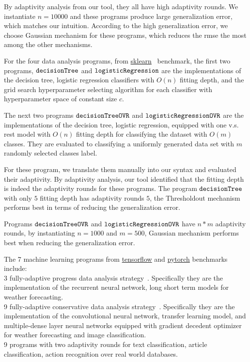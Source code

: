 By adaptivity analysis from our tool, they all have high adaptivity rounds.
We instantiate $n = 10000$ and these programs produce large generalization error, which matches our intuition.
According to the high generalization error, we choose Gaussian mechanism for these programs, which reduces the rmse the most
among the other mechanisms.


For the four data analysis programs, 
from \hyperlink{https://github.com/scikit-learn/scikit-learn/tree/main/examples}{sklearn}~\cite{SklearnBenchmark} benchmark,
the first two programs, $\mathtt{decisionTree}$ and $\mathtt{logisticRegression}$ are
the
implementations of the decision tree, logistic regression classifiers
with $O(n)$ fitting depth,
and the grid search hyperparameter selecting algorithm for each classifier with 
hyperparameter space of constant size $c$.

The next two programs $\mathtt{decisionTreeOVR}$ and $\mathtt{logisticRegressionOVR}$ are
the implementations of the  decision tree, logistic regression, equipped with one v.s. rest model with $O(n)$ fitting depth for classifying the dataset with $O(m)$ classes.
They are evaluated to classifying a uniformly generated data set with $m$ randomly selected classes label.

For these program, we translate them manually into our syntax and evaluated their adaptivity.
By adaptivity analysis, our tool identified that the fitting depth is indeed the adaptivity rounds for these programs.
The program $\mathtt{decisionTree}$ with only $5$ fitting depth has adaptivity rounds $5$,
the Thresholdout mechanism performs best in terms of reducing the generalization error.

Programs $\mathtt{decisionTreeOVR}$ and $\mathtt{logisticRegressionOVR}$ 
have $n*m$ adaptivity rounds, by instantiating $n = 1000$ and $m = 500$,
Gaussian mechanism performs best when reducing the generalization error.








The 7 machine learning programs
from \hyperlink{https://github.com/tensorflow/tensorflow/tree/master/tensorflow/examples}{tensorflow}
and \hyperlink{https://github.com/pytorch/pytorch}{pytorch}
benchmarks include:
\\
3 fully-adaptive progress data analysis
strategy~\cite{ZrnicH19}.
Specifically they are the implementation of the recurrent neural network, long short term models for 
weather forecasting.
\\
9
fully-adaptive conservative data analysis
strategy~\cite{ZrnicH19}.
Specifically they are the implementation of the convolutional neural network, transfer learning model,
and multiple-dense layer neural networks equipped with gradient decedent optimizer for
weather forecasting and image classification.
\\
9 programs with two adaptivity rounds for text classification,
article classification, action recognition over real world databases.
